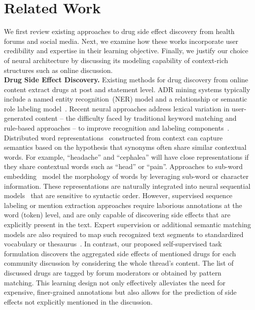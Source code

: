 \documentclass{bmcart}
\begin{document}
\section{Related Work}\label{sec:related_work}

We first review existing approaches to drug side effect discovery from health forums and social media. Next, we examine how these works incorporate user credibility and expertise in their learning objective. Finally, we justify our choice of neural architecture by discussing its modeling capability of context-rich structures such as online discussion. \\

{\bf Drug Side Effect Discovery.} Existing methods for drug discovery from online content extract drugs at post and statement level. ADR mining systems typically include 
a named entity recognition~(NER) model and a relationship or semantic role labeling model~\cite{sampathkumar2014mining,liu2018patient}. 
Recent neural approaches address lexical variation in user-generated content -- the difficulty faced by traditional keyword matching and rule-based approaches -- to improve recognition and labeling components~\cite{ding2018attentive,wunnava2019adverse}. 
Distributed word representations~\cite{mikolov2013distributed,pennington2014glove} constructed from context can capture semantics based on the hypothesis that synonyms often share similar contextual words. For example, ``headache'' and ``cephalea'' will have close representations if they share contextual words such as ``head'' or ``pain''. Approaches to sub-word embedding~\cite{bojanowski2017enriching,akbik2019flair} model the morphology of words by leveraging sub-word or character information. These representations are naturally integrated into neural sequential models~\cite{kim2014convolutional,sutskever2014sequence,devlin2019bert} that are sensitive to syntactic order. 
However, supervised sequence labeling or mention extraction approaches require laborious annotations at the word (token) level, and are only capable of discovering side effects that are explicitly present in the text. Expert supervision or additional semantic matching models are also required to map such recognized text segments to standardized vocabulary or thesaurus~\cite{yates2015extracting}. In contrast, our proposed self-supervised task formulation discovers the aggregated side effects of mentioned drugs for each community discussion by considering the whole thread's content. The list of discussed drugs are tagged by forum moderators or obtained by pattern matching. This learning design not only effectively alleviates the need for expensive, finer-grained annotations but also allows for the prediction of side effects not explicitly mentioned in the discussion. \\
\end{document}
